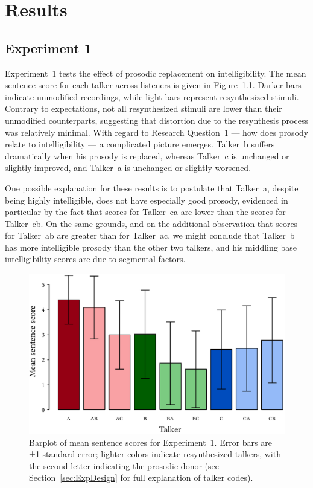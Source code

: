 \chapter{Results}

\section{Experiment 1}
Experiment~1 tests the effect of prosodic replacement on intelligibility.  The mean sentence score for each talker across listeners is given in Figure~\ref{fig:ExpOneBarplot}.  Darker bars indicate unmodified recordings, while light bars represent resynthesized stimuli.  Contrary to expectations, not all resynthesized stimuli are lower than their unmodified counterparts, suggesting that distortion due to the resynthesis process was relatively minimal.  With regard to Research Question~1 — how does prosody relate to intelligibility — a complicated picture emerges.  Talker~\ac{b} suffers dramatically when his prosody is replaced, whereas Talker~\ac{c} is unchanged or slightly improved, and Talker~\ac{a} is unchanged or slightly worsened.

One possible explanation for these results is to postulate that Talker~\ac{a}, despite being highly intelligible, does not have especially good prosody, evidenced in particular by the fact that scores for Talker~\ac{ca} are lower than the scores for Talker~\ac{cb}.  On the same grounds, and on the additional observation that scores for Talker~\ac{ab} are greater than for Talker~\ac{ac}, we might conclude that Talker~\ac{b} has more intelligible prosody than the other two talkers, and his middling base intelligibility scores are due to segmental factors.

\begin{figure}[htbp]
	\begin{centering}
	\includegraphics{figures/results/ExpOneBarplot.eps}
	\caption[Barplot of mean sentence scores for Experiment~1]{Barplot of mean sentence scores for Experiment~1.  Error bars are ±1 standard error; lighter colors indicate resynthesized talkers, with the second letter indicating the prosodic donor (see Section~\ref{sec:ExpDesign} for full explanation of talker codes).\label{fig:ExpOneBarplot}}
	\end{centering}
\end{figure}

